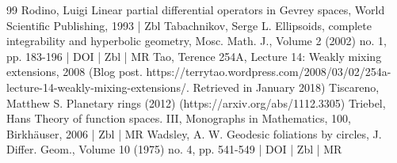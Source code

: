 \documentclass[10pt]{amsart}
\theoremstyle{definition}\newtheorem{defi}[theo]{Definition}\newtheorem{rema}[theo]{Remark}\newtheorem{exam}[theo]{Example}\newtheorem{exem}[theo]{Example}\newtheorem{nota}[theo]{Notation}
\begin{document}
\begin{thebibliography}{99}
Rodino, Luigi Linear partial differential operators in Gevrey spaces, World Scientific Publishing, 1993 | Zbl
Tabachnikov, Serge L. Ellipsoids, complete integrability and hyperbolic geometry, Mosc. Math. J., Volume 2 (2002) no. 1, pp. 183-196 | DOI | Zbl | MR
Tao, Terence 254A, Lecture 14: Weakly mixing extensions, 2008 (Blog post. https://terrytao.wordpress.com/2008/03/02/254a-lecture-14-weakly-mixing-extensions/. Retrieved in January 2018)
Tiscareno, Matthew S. Planetary rings (2012) (https://arxiv.org/abs/1112.3305)
Triebel, Hans Theory of function spaces. III, Monographs in Mathematics, 100, Birkhäuser, 2006 | Zbl | MR
Wadsley, A. W. Geodesic foliations by circles, J. Differ. Geom., Volume 10 (1975) no. 4, pp. 541-549 | DOI | Zbl | MR
\end{thebibliography}
\end{document}

